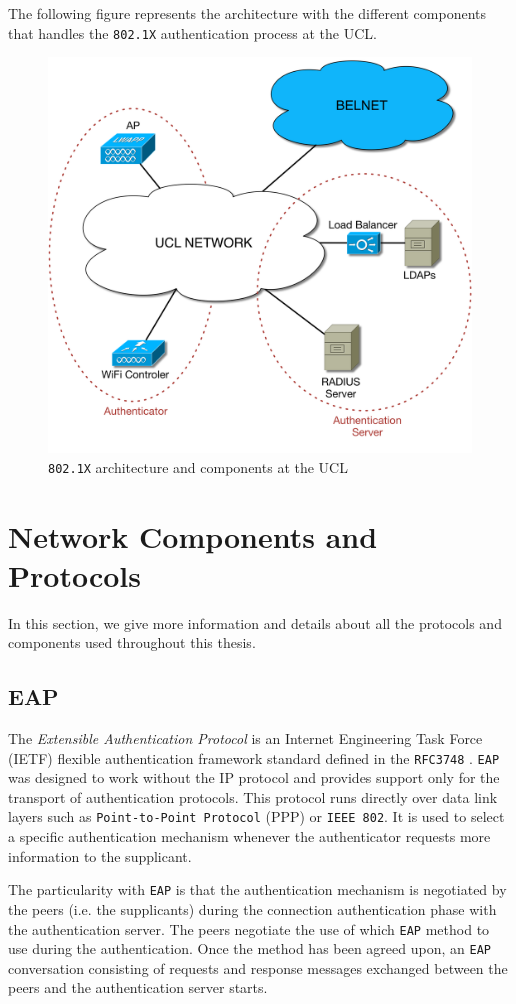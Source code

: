 The following figure represents the architecture with the different components that handles the \texttt{802.1X} authentication process at the UCL. 

\begin{figure}[H]
	\center
	\includegraphics[width=0.7\linewidth]{Pictures/chapter2/802-archi.png}
	\caption{\texttt{802.1X} architecture and components at the UCL}
\end{figure}



\section{Network Components and Protocols}
In this section, we give more information and details about all the protocols and components used throughout this thesis.

\subsection{EAP}
The \textit{Extensible Authentication Protocol} is an Internet Engineering Task Force (IETF) flexible authentication framework standard defined in the \texttt{RFC3748} \cite{rfc3748}. \texttt{EAP} was designed to work without the IP protocol and provides support only for the transport of authentication protocols. This protocol runs directly over data link layers such as \texttt{Point-to-Point Protocol} (PPP) or \texttt{IEEE 802}. It is used to select a specific authentication mechanism whenever the authenticator requests more information to the supplicant.

The particularity with \texttt{EAP} is that the authentication mechanism is negotiated by the peers (i.e. the supplicants) during the connection authentication phase with the authentication server. The peers negotiate the use of which \texttt{EAP} method to use during the authentication. Once the method has been agreed upon, an \texttt{EAP} conversation consisting of requests and response messages exchanged between the peers and the authentication server starts.

